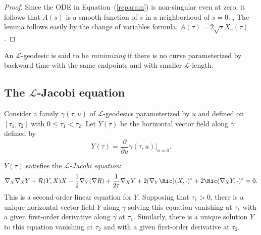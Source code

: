 \begin{proof}
\sketch
{}
Since the ODE in Equation~(\ref{reparam})  is non-singular even at
zero, it follows that $A(s)$ is a smooth function of $s$ in a
neighborhood of $s=0$. , The lemma follows easily by the change of
variables formula, $A(\tau)=2\sqrt{\tau}X_\gamma(\tau)$.
\end{proof}

\begin{definition}\label{def:l-geodesic-minimizing}
An ${\mathcal L}$-geodesic is said to be {\em
minimizing} if there is no
curve parameterized by backward time with the same endpoints and
with smaller ${\mathcal L}$-length.
\end{definition}


\subsection{The ${\mathcal L}$-Jacobi equation}

Consider a family $\gamma(\tau,u)$ of ${\mathcal L}$-geodesics parameterized by
$u$ and defined on $[\tau_1,\tau_2]$ with $0\le \tau_1<\tau_2$. Let $Y(\tau)$
be the horizontal vector field along $\gamma$ defined by
$$Y(\tau)=\frac{\partial}{\partial u}\gamma(\tau,u)|_{u=0}.$$


\begin{lemma}\label{lem:l-jacobi-equation}
$Y(\tau)$ satisfies the {\em ${\mathcal L}$-Jacobi
equation}:
\begin{equation}\label{jaceqn}\nabla_X\nabla_XY+{\mathcal
R}(Y,X)X-\frac{1}{2}\nabla_Y(\nabla
R)+\frac{1}{2\tau}\nabla_XY+2(\nabla_Y\Ric)(X,\cdot)^*+2\Ric(\nabla_XY,\cdot)^*=0.\end{equation} This is a second-order
linear equation for $Y$. Supposing that $\tau_1>0$, there is a
unique horizontal vector field $Y$ along $\gamma$ solving this
equation vanishing at $\tau_1$ with a given first-order derivative
along $\gamma$ at $\tau_1$. Similarly, there is a unique solution
$Y$ to this equation vanishing at $\tau_2$ and with a given
first-order derivative at $\tau_2$.
\end{lemma}


